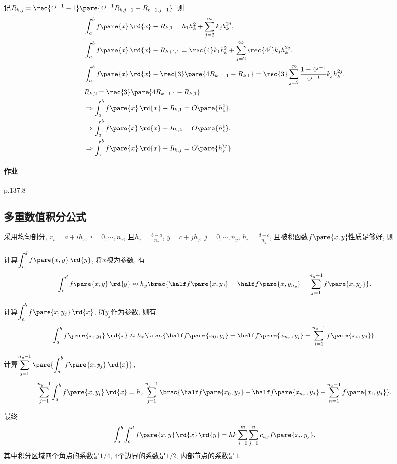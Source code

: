 \documentclass[hidelinks]{ctexart}
\begin{document}
记$\displaystyle R_{k,j} = \rec{4^{j-1}-1}\pare{4^{j-1}R_{k,j-1} - R_{k-1,j-1}}$, 则
\begin{align*}
    & \int_a^b f\pare{x}\,\rd{x} - R_{k,1} = h_1 h_k^2 + \sum_{j=2}^\infty k_j h_k^{2j}, \\
    & \int_a^b f\pare{x}\,\rd{x} - R_{k+1,1} = \rec{4}k_1h_k^2 + \sum_{j=2}^\infty \rec{4^j}k_j h_k^{2j}, \\
    & \int_a^b f\pare{x}\,\rd{x} - \rec{3}\pare{4R_{k+1,1} - R_{k,1}} = \rec{3} \sum_{j=2}^\infty \frac{1-4^{j-1}}{4^{j-1}} k_j h_k^{2j}. \\
    & R_{k,2} = \rec{3}\pare{4R_{k+1,1} - R_{k,1}} \\
    & \Rightarrow \int_a^b f\pare{x}\,\rd{x} - R_{k,1} = O\pare{h_k^2}, \\
    & \Rightarrow \int_a^b f\pare{x}\,\rd{x} - R_{k,2} = O\pare{h_k^4}, \\
    & \Rightarrow \int_a^b f\pare{x}\,\rd{x} - R_{k,j} = O\pare{h_k^{2j}}.
\end{align*}


\paragraph{作业} %
\label{par:作业}

p.137.8




\subsection{多重数值积分公式} %
\label{sub:多重数值积分公式}

采用均匀剖分, $x_i = a+ih_x$, $\displaystyle i = 0,\cdots,n_x$, 且$\displaystyle h_x = \frac{b-a}{n_x}$, $y = c + jh_y$, $j = 0,\cdots,n_y$, $\displaystyle h_y = \frac{d-c}{n_y}$, 且被积函数$f\pare{x,y}$性质足够好, 则
\begin{cenum}
    \item 计算$\displaystyle \int_c^d f\pare{x,y}\,\rd{y}$, 将$x$视为参数, 有
    \[ \int_c^d f\pare{x,y}\,\rd{y} \approx h_y \brac{\half f\pare{x,y_0} + \half f\pare{x,y_{n_y}} + \sum_{j=1}^{n_y - 1}f\pare{x,y_j}}. \]
    \item 计算$\displaystyle \int_a^b f\pare{x,y_j}\,\rd{x}$, 将$y_j$作为参数, 则有
    \[ \int_a^b f\pare{x,y_j}\,\rd{x} \approx h_x\brac{\half f\pare{x_0,y_j} + \half f\pare{x_{n_x},y_j} + \sum_{i=1}^{n_x - 1}f\pare{x_i,y_j}}. \]
    \item 计算$\displaystyle \sum_{j=1}^{n_y-1} \pare{\int_a^b f\pare{x,y_j}\,\rd{x}}$,
    \[ \sum_{j=1}^{n_y-1} \int_a^b f\pare{x,y_j}\,\rd{x} = h_x \sum_{j=1}^{n_y - 1}\brac{\half f\pare{x_0,y_j} + \half f\pare{x_{n_x},y_j} + \sum_{n=1}^{n_x-1}f\pare{x_i,y_j}}. \]
\end{cenum}
最终
\[ \int_a^b \int_c^d f\pare{x,y}\,\rd{x}\,\rd{y} = hk\sum_{i=0}^m \sum_{j=0}^n c_{i,j} f\pare{x_i,y_j}. \]
其中积分区域四个角点的系数是$1/4$, $4$个边界的系数是$1/2$, 内部节点的系数是$1$.
\end{document}

